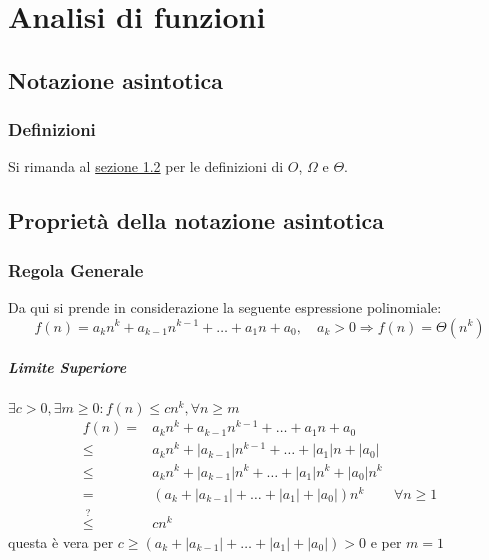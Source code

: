 \chapter{Analisi di funzioni}
\thispagestyle{chapterInit}
\section{Notazione asintotica}
    \subsection{Definizioni}
        Si rimanda al \hyperref[sec:notazioneAsintotica]{sezione 1.2} per le definizioni di $O$, $\Omega$ e $\Theta$.
\section{Proprietà della notazione asintotica}
    \subsection{Regola Generale}
        Da qui si prende in considerazione la seguente espressione polinomiale:
        $$
            f(n) = a_kn^k + a_{k-1}n^{k-1} + \ldots + a_1n + a_0, \quad a_k > 0 \Rightarrow f(n) = \Theta(n^k)
        $$
        \paragraph{Limite Superiore} $ \exists c>0, \exists m\geq 0: f(n)\leq cn^k,\forall n\geq m $
            $$
                \begin{aligned}
                    f(n)=&a_kn^k + a_{k-1}n^{k-1} + \ldots + a_1n + a_0 \\
                    \leq& a_kn^k + \left|a_{k-1}\right|n^{k-1} + \ldots + \left|a_1\right|n + \left|a_0\right| \\
                    \leq& a_kn^k + \left|a_{k-1}\right|n^k + \ldots + \left|a_1\right|n^k + \left|a_0\right|n^k \\
                    =& (a_k + \left|a_{k-1}\right| + \ldots + \left|a_1\right| + \left|a_0\right|)n^k \quad& \forall n\geq 1\\
                    \stackrel{?}{\leq}& cn^k
                \end{aligned}
            $$
            questa è vera per $ c\geq \left(a_k + \left|a_{k-1}\right| + \ldots + \left|a_1\right| + \left|a_0\right| \right) >0$ e per $m=1$

